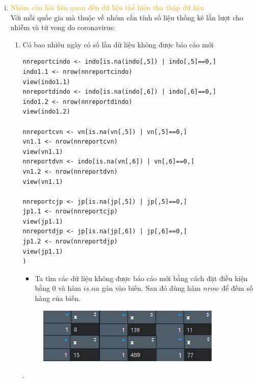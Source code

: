 \documentclass[a4paper]{article}
\theoremstyle{definition}
\begin{document}
\begin{enumerate}[i)]
\begin{enumerate}[1)]
\end{enumerate}
\newpage
\item \textcolor{orange}{Nhóm câu hỏi liên quan đến dữ liệu thể hiện thu thập dữ liệu}\\
Với mỗi quốc gia mà thuộc về nhóm cần tính số liệu thống kê lần lượt cho nhiễm và tử vong do coronavirus:
\begin{enumerate}[1)]
\begin{lstlisting}[frame=single]  
indo <- data[data[,1]=="IDN",]
vn <- data[data[,1]=="VNM",]
jp <- data[data[,1]=="JPN",]
	\end{lstlisting}
	\begin{itemize}
	    \item Tạo data của mỗi quốc gia indonesia, vietnam và japan.
	\end{itemize}
    \item Có bao nhiêu ngày có số lần dữ liệu không được báo cáo mới
    \begin{lstlisting}[frame=single]  
nnreportcindo <- indo[is.na(indo[,5]) | indo[,5]==0,]
indo1.1 <- nrow(nnreportcindo)
view(indo1.1)
nnreportdindo <- indo[is.na(indo[,6]) | indo[,6]==0,]
indo1.2 <- nrow(nnreportdindo)
view(indo1.2)

nnreportcvn <- vn[is.na(vn[,5]) | vn[,5]==0,]
vn1.1 <- nrow(nnreportcvn)
view(vn1.1)
nnreportdvn <- indo[is.na(vn[,6]) | vn[,6]==0,]
vn1.2 <- nrow(nnreportdvn)
view(vn1.1)

nnreportcjp <- jp[is.na(jp[,5]) | jp[,5]==0,]
jp1.1 <- nrow(nnreportcjp)
view(jp1.1)
nnreportdjp <- jp[is.na(jp[,6]) | jp[,6]==0,]
jp1.2 <- nrow(nnreportdjp)
view(jp1.1)
)
	\end{lstlisting}
	\begin{itemize}
	    \item Ta tìm các dữ liệu không được báo cáo mới bằng cách đặt điều kiện bằng 0 và hàm $is.na$ gán vào biến. Sau đó dùng hàm $nrow$ để đếm số hàng của biến.
	\end{itemize}
	\begin{figure}[h!]
		\begin{center}
		    \includegraphics[scale=1.5]{Images/III/iii1.png}
		\end{center}
	\end{figure}.
    

\end{enumerate}
\end{enumerate}
\end{document}
